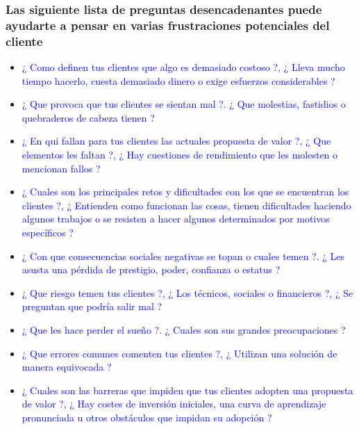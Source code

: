 \documentclass[11pt]{book}
\begin{document}
\begin{enumerate}
\subsubsection{Las siguiente lista de preguntas desencadenantes puede ayudarte a pensar en varias frustraciones potenciales del cliente}
\begin{itemize}
\item \textcolor {blue}{¿ Como definen tus clientes que algo es demasiado costoso ?, ¿ Lleva mucho tiempo hacerlo, cuesta demasiado dinero o exige esfuerzos considerables ?}
\item \textcolor {blue}{¿ Que provoca que tus clientes se sientan mal ?. ¿ Que molestias, fastidios o quebraderos de cabeza tienen ?}
\item \textcolor {blue}{¿ En qui fallan para tus clientes las actuales propuesta de valor ?, ¿ Que elementos les faltan ?, ¿ Hay cuestiones de rendimiento que les molesten o mencionan fallos ?}
\item \textcolor {blue}{¿ Cuales son los principales retos y dificultades con los que se encuentran los clientes ?, ¿ Entienden como funcionan las cosas, tienen dificultades haciendo algunos trabajos o se resisten a hacer algunos determinados por motivos específicos ?}
\item \textcolor {blue}{¿ Con que consecuencias sociales negativas se topan o cuales temen ?. ¿ Les asusta una pérdida de prestigio, poder, confianza o estatus ?}
\item \textcolor {blue}{¿ Que riesgo temen tus clientes ?, ¿ Los técnicos, sociales o financieros ?, ¿ Se preguntan que podría salir mal ?}
\item \textcolor {blue}{¿ Que les hace perder el sueño ?. ¿ Cuales son sus grandes preocupaciones ?}
\item \textcolor {blue}{¿ Que errores comunes comenten tus clientes ?, ¿ Utilizan una solución de manera equivocada ?}
\item \textcolor {blue}{¿ Cuales son las barreras que impiden que tus clientes adopten una propuesta de valor ?, ¿ Hay costes de inversión iniciales, una curva de aprendizaje pronunciada u otros obstáculos que impidan su adopción ?}
\end{itemize}
\end{enumerate}
\end{document}
